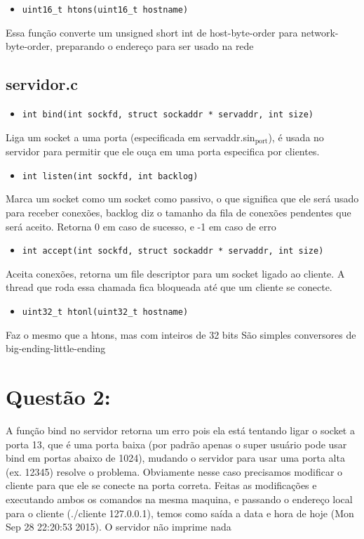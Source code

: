 \documentclass[11pt]{article}
\begin{document}
\begin{itemize}
\item \texttt{uint16\_t htons(uint16\_t hostname)}
\end{itemize}
Essa função converte um unsigned short int de host-byte-order para
network-byte-order, preparando o endereço para ser usado na rede 

\subsection{servidor.c}
\label{sec-1-2}

\begin{itemize}
\item \texttt{int bind(int sockfd, struct sockaddr * servaddr, int size)}
\end{itemize}
Liga um socket a uma porta (especificada em servaddr.sin$_{\text{port}}$), é
usada no servidor para permitir que ele ouça em uma porta especifica
por clientes.

\begin{itemize}
\item \texttt{int listen(int sockfd, int backlog)}
\end{itemize}
Marca um socket como um socket como passivo, o que significa que ele
será usado para receber conexões, backlog diz o tamanho da fila de
conexões pendentes que será aceito.
Retorna 0 em caso de sucesso, e -1 em caso de erro

\begin{itemize}
\item \texttt{int accept(int sockfd, struct sockaddr * servaddr, int size)}
\end{itemize}
Aceita conexões, retorna um file descriptor para um socket ligado ao
cliente. A thread que roda essa chamada fica bloqueada até que um
cliente se conecte.

\begin{itemize}
\item \texttt{uint32\_t htonl(uint32\_t hostname)}
\end{itemize}
Faz o mesmo que a htons, mas com inteiros de 32 bits
São simples conversores de big-ending-little-ending

\section*{Questão 2:}
\label{sec-2}
A função bind no servidor retorna um erro pois ela está tentando ligar
o socket a porta 13, que é uma porta baixa (por padrão apenas o super
usuário pode usar bind em portas abaixo de 1024), mudando o servidor
para usar uma porta alta (ex. 12345) resolve o problema.
Obviamente nesse caso precisamos modificar o cliente para que ele se
conecte na porta correta.
Feitas as modificações e executando ambos os comandos na mesma
maquina, e passando o endereço local para o cliente (./cliente
127.0.0.1), temos como saída a data e hora de hoje (Mon Sep 28
22:20:53 2015). O servidor não imprime nada
\end{document}
